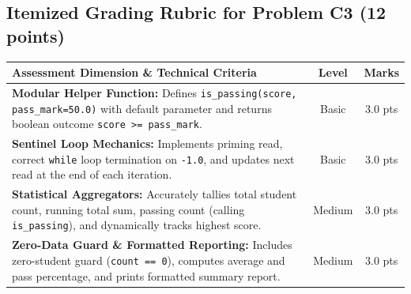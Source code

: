 \documentclass[11pt,a4paper]{article}
\begin{document}
\newpage

\subsection*{Itemized Grading Rubric for Problem C3 (12 points)}

\begin{center}
\renewcommand{\arraystretch}{1.18}
\setlength{\tabcolsep}{3.5pt}
\begin{tabularx}{\textwidth}{|X|c|c|}
\hline
\textbf{Assessment Dimension \& Technical Criteria} & \textbf{Level} & \textbf{Marks} \\
\hline
\textbf{Modular Helper Function:} Defines \texttt{is\_passing(score, pass\_mark=50.0)} with default parameter and returns boolean outcome \texttt{score >= pass\_mark}. & Basic & 3.0 pts \\
\hline
\textbf{Sentinel Loop Mechanics:} Implements priming read, correct \texttt{while} loop termination on \texttt{-1.0}, and updates next read at the end of each iteration. & Basic & 3.0 pts \\
\hline
\textbf{Statistical Aggregators:} Accurately tallies total student count, running total sum, passing count (calling \texttt{is\_passing}), and dynamically tracks highest score. & Medium & 3.0 pts \\
\hline
\textbf{Zero-Data Guard \& Formatted Reporting:} Includes zero-student guard (\texttt{count == 0}), computes average and pass percentage, and prints formatted summary report. & Medium & 3.0 pts \\
\hline
\end{tabularx}
\end{center}
\end{document}
